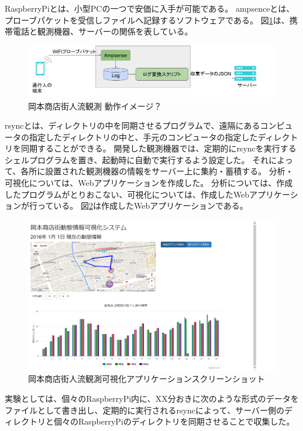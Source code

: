 RaspberryPiとは、小型PCの一つで安価に入手が可能である。
ampsenceとは、プローブパケットを受信しファイルへ記録するソフトウェアである。
図\ref{fig:okamoto_pict2}は、携帯電話と観測機器、サーバーの関係を表している。
\begin{figure}[htbp]
\includegraphics[width=16cm]{images/okamoto_pict2.png}
\caption{岡本商店街人流観測 動作イメージ？}
\label{fig:okamoto_pict2}
\end{figure}

rsyncとは、ディレクトリの中を同期させるプログラムで、遠隔にあるコンピュータの指定したディレクトリの中と、手元のコンピュータの指定したディレクトリを同期することができる。
開発した観測機器では、定期的にrsyncを実行するシェルプログラムを置き、起動時に自動で実行するよう設定した。
それによって、各所に設置された観測機器の情報をサーバー上に集約・蓄積する。
分析・可視化については、Webアプリケーションを作成した。
分析については、作成したプログラムがとりおこない、可視化については、作成したWebアプリケーションが行っている。
図\ref{fig:okamoto_ss}は作成したWebアプリケーションである。
\begin{figure}[htbp]
\includegraphics[width=16cm]{images/okamoto_scr1.png}
\caption{岡本商店街人流観測可視化アプリケーションスクリーンショット}
\label{fig:okamoto_ss}
\end{figure}

実験としては、個々のRaspberryPi内に、XX分おきに次のような形式のデータをファイルとして書き出し、定期的に実行されるrsyncによって、サーバー側のディレクトリと個々のRaspberryPiのディレクトリを同期させることで収集した。


